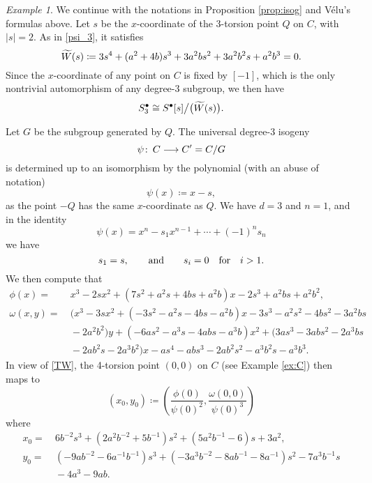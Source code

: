 \documentclass{gtpart}
\theoremstyle{definition}
\theoremstyle{remark}
\newtheorem{ex}[thm]{Example}
\def\co{\colon\thinspace}
\newcommand{\TW}{\widetilde{W\thinspace}\!}
\newcommand{\ad}{{\rm and}}
\newcommand{\s}{S^\bullet}
\newcommand{\ce}{\coloneqq}
\numberwithin{equation}{section}
\numberwithin{thm}{section}
\begin{document}
\begin{ex}
\label{ex:velu}
 We continue with the notations in Proposition \ref{prop:isog} and 
 V\'elu's formulas above.  Let $s$ be the $x$-coordinate of the 
 3-torsion point $Q$ on $C$, with $|s| = 2$.  As in \eqref{psi_3}, it 
 satisfies 
 \begin{equation}
 \label{TW}
  \TW(s) \ce 3 s^4 + (a^2 + 4 b) s^3 + 3 a^2 b s^2 + 3 a^2 b^2 s 
  + a^2 b^3 = 0.  
 \end{equation}
 Since the $x$-coordinate of any point on $C$ is fixed by $[-1]$, which 
 is the only nontrivial automorphism of any degree-3 subgroup, we then 
 have 
 \[
  \s_3 \cong \s [s] \big/ \big( \TW(s) \big).  
 \]

 Let $G$ be the subgroup generated by $Q$.  The universal degree-3 
 isogeny 
 \[
  \psi \co C \longrightarrow C' = C/G 
 \]
 is determined up to an isomorphism by the polynomial (with an abuse of 
 notation) 
 \[
  \psi(x) \ce x - s, 
 \]
 as the point $-Q$ has the same $x$-coordinate as $Q$.  We have $d = 3$ 
 and $n = 1$, and in the identity 
 \[
  \psi(x) = x^n - s_1 x^{n-1} + \cdots + (-1)^n s_n 
 \]
 we have 
 \[
  s_1 = s, \qquad \ad \qquad s_i = 0 \quad \text{for} \quad i > 1.  
 \]
 We then compute that 
 \begin{equation*}
 \begin{split}
      \phi(x) = & ~ x^3 - 2 s x^2 + (7 s^2+ a^2 s + 4 b s + a^2 b) x - 2 s^3 + a^2 b s + a^2 b^2, \\
  \omega(x,y) = & ~ \big( x^3 - 3 s x^2 + (-3 s^2 - a^2 s - 4 b s - a^2 b) x - 3 s^3 - a^2 s^2 - 4 b s^2 - 3 a^2 b s \\
                & ~ - 2 a^2 b^2 \big) y + (-6 a s^2 - a^3 s - 4 a b s - a^3 b) x^2 + (3 a s^3 - 3 a b s^2 -2 a^3 b s \\
                & ~ - 2 a b^2 s - 2 a^3 b^2) x - a s^4 - a b s^3 - 2 a b^2 s^2 - a^3 b^2 s - a^3 b^3.  
 \end{split}
 \end{equation*}
 In view of \eqref{TW}, the 4-torsion point $(0,0)$ on $C$ (see Example 
 \ref{ex:C}) then maps to 
 \[
  (x_0, y_0) \ce \left( \frac{\phi(0)}{\psi(0)^2}, 
  \frac{\omega(0,0)}{\psi(0)^3} \right) 
 \]
 where 
 \begin{equation*}
 \begin{split}
  x_0 = & ~ 6 b^{-2} s^3 + (2 a^2 b^{-2} + 5 b^{-1}) s^2 + (5 a^2 b^{-1} - 6) s + 3 a^2, \\
  y_0 = & ~ (-9 a b^{-2} - 6 a^{-1} b^{-1}) s^3 + (-3 a^3 b^{-2} - 8 a b^{-1} - 8 a^{-1}) s^2 - 7 a^3 b^{-1} s \\
        & ~ - 4 a^3 - 9 a b.  
 \end{split}
 \end{equation*}


\end{ex}
\end{document}
